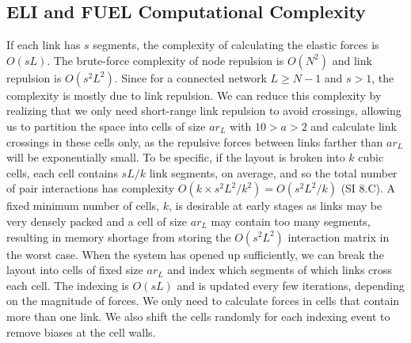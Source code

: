 \documentclass[endfloats,nofootinbib,preprint,floatfix,titlepage,superscriptaddress,linenumbers]{revtex4-1} %
\begin{document}
{ 
\subsection{ELI and FUEL Computational Complexity}
If each link has $s$ segments, the  complexity of calculating the elastic forces is $O(sL)$.
The brute-force complexity of node repulsion is $O(N^2)$ and link repulsion is $O(s^2L^2)$.
Since for a connected network $L\geq N-1$ and $s>1$, the complexity is mostly due to link repulsion. 
We can reduce this complexity by realizing that we only need short-range link repulsion to avoid crossings, allowing us to partition the space into cells of size $ar_L$ with $10>a>2$ and calculate link crossings in these cells only, as the repulsive forces between links farther than $ar_L$ will be exponentially small.
To be specific, if the layout is broken into $k$ cubic cells, each cell contains $sL/k$ link segments, on average, and so the total number of pair interactions has complexity
$O(k\times s^2L^2/k^2 ) = O(s^2L^2/k)$ (SI 8.C). 
A fixed minimum number of cells, $k$, is desirable at early stages as links may be very densely packed and a cell of size $ar_L$ may contain too many segments, resulting in memory shortage from storing the $O(s^2L^2)$ interaction matrix in the worst case. 
When the system has opened up sufficiently, we can break the layout into cells of fixed size $ar_L$ and index which segments of which links cross each cell. 
The indexing is $O(sL)$ and is updated every few iterations, depending on the magnitude of forces.
We only need to calculate forces in cells that contain more than one link.
We also shift the cells randomly for each indexing event to remove biases at the cell walls. 


}
\end{document}
